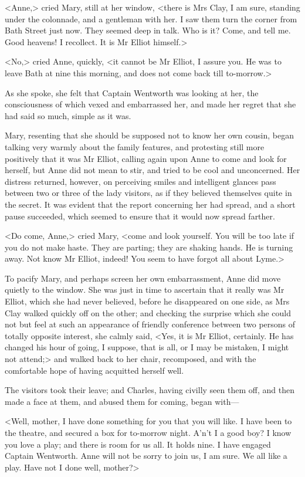 <Anne,> cried Mary, still at her window, <there is Mrs Clay, I am sure, standing under the colonnade, and a gentleman with her. I saw them turn the corner from Bath Street just now. They seemed deep in talk. Who is it? Come, and tell me. Good heavens! I recollect. It is Mr Elliot himself.>

<No,> cried Anne, quickly, <it cannot be Mr Elliot, I assure you. He was to leave Bath at nine this morning, and does not come back till to-morrow.>

As she spoke, she felt that Captain Wentworth was looking at her, the consciousness of which vexed and embarrassed her, and made her regret that she had said so much, simple as it was.

Mary, resenting that she should be supposed not to know her own cousin, began talking very warmly about the family features, and protesting still more positively that it was Mr Elliot, calling again upon Anne to come and look for herself, but Anne did not mean to stir, and tried to be cool and unconcerned. Her distress returned, however, on perceiving smiles and intelligent glances pass between two or three of the lady visitors, as if they believed themselves quite in the secret. It was evident that the report concerning her had spread, and a short pause succeeded, which seemed to ensure that it would now spread farther.

<Do come, Anne,> cried Mary, <come and look yourself. You will be too late if you do not make haste. They are parting; they are shaking hands. He is turning away. Not know Mr Elliot, indeed! You seem to have forgot all about Lyme.>

To pacify Mary, and perhaps screen her own embarrassment, Anne did move quietly to the window. She was just in time to ascertain that it really was Mr Elliot, which she had never believed, before he disappeared on one side, as Mrs Clay walked quickly off on the other; and checking the surprise which she could not but feel at such an appearance of friendly conference between two persons of totally opposite interest, she calmly said, <Yes, it is Mr Elliot, certainly. He has changed his hour of going, I suppose, that is all, or I may be mistaken, I might not attend;> and walked back to her chair, recomposed, and with the comfortable hope of having acquitted herself well.

The visitors took their leave; and Charles, having civilly seen them off, and then made a face at them, and abused them for coming, began with—

<Well, mother, I have done something for you that you will like. I have been to the theatre, and secured a box for to-morrow night. A'n't I a good boy? I know you love a play; and there is room for us all. It holds nine. I have engaged Captain Wentworth. Anne will not be sorry to join us, I am sure. We all like a play. Have not I done well, mother?>

